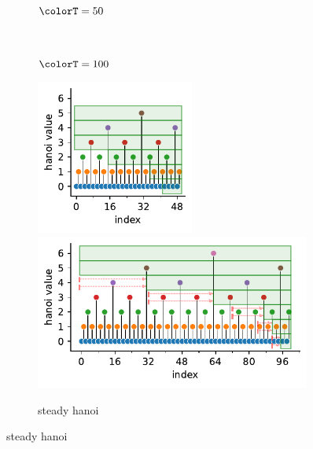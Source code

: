 \begin{figure}[h!]
\begin{subfigure}[b]{\linewidth}
\begin{minipage}[]{0.08\textwidth}
~
\end{minipage}%
\begin{minipage}[]{0.25\textwidth}
\centering
$\colorT = 50$
\end{minipage}%
\begin{minipage}[]{0.05\textwidth}
~
\end{minipage}%
\begin{minipage}[]{0.61\textwidth}
\centering
$\colorT = 100$
\end{minipage}
\includegraphics[height=2in]{binder/teeplots/hanoi-strategy/hue=hanoi-value+viz=lolliplot+what=last-n-before+x=index+y=hanoi-value+ext=}%
\includegraphics[height=2in]{binder/teeplots/hanoi-strategy/hue=hanoi-value+viz=lolliplot+what=last-n-after+x=index+y=hanoi-value+ext=}
\caption{
  steady hanoi
}
\end{subfigure}



\end{figure}
